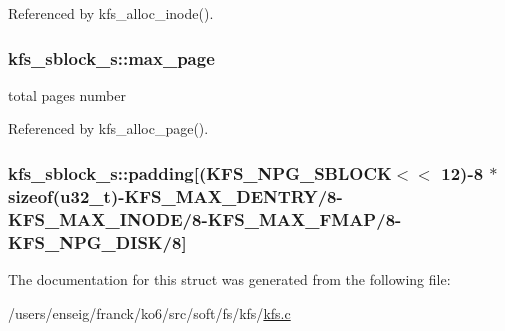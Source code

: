 Referenced by kfs\-\_\-alloc\-\_\-inode().

\hypertarget{structkfs__sblock__s_a097af9f6c4329c629453634d52d2a8b0}{
\subsubsection[{max\-\_\-page}]{ kfs\-\_\-sblock\-\_\-s\-::max\-\_\-page}}\label{structkfs__sblock__s_a097af9f6c4329c629453634d52d2a8b0}


total pages number 



Referenced by kfs\-\_\-alloc\-\_\-page().

\hypertarget{structkfs__sblock__s_acb2d63ab6c4b6bfb0bbd4273fbb3864d}{
\subsubsection[{padding}]{ kfs\-\_\-sblock\-\_\-s\-::padding\mbox{[}({\bf K\-F\-S\-\_\-\-N\-P\-G\-\_\-\-S\-B\-L\-O\-C\-K}$<$$<$ 12)-\/8 $\ast$sizeof({\bf u32\-\_\-t})-\/{\bf K\-F\-S\-\_\-\-M\-A\-X\-\_\-\-D\-E\-N\-T\-R\-Y}/8-\/{\bf K\-F\-S\-\_\-\-M\-A\-X\-\_\-\-I\-N\-O\-D\-E}/8-\/{\bf K\-F\-S\-\_\-\-M\-A\-X\-\_\-\-F\-M\-A\-P}/8-\/{\bf K\-F\-S\-\_\-\-N\-P\-G\-\_\-\-D\-I\-S\-K}/8\mbox{]}}}\label{structkfs__sblock__s_acb2d63ab6c4b6bfb0bbd4273fbb3864d}


The documentation for this struct was generated from the following file\-:\begin{DoxyCompactItemize}
\item 
/users/enseig/franck/ko6/src/soft/fs/kfs/\hyperlink{kfs_8c}{kfs.\-c}\end{DoxyCompactItemize}
